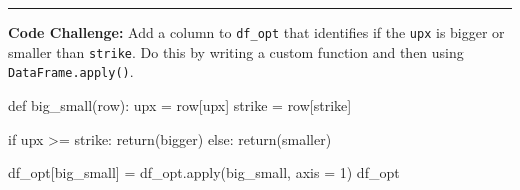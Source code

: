 \documentclass[
  letterpaper,
  DIV=11,
  numbers=noendperiod]{scrreprt}
\newenvironment{Shaded}{\begin{snugshade}}{\end{snugshade}}
\newcommand{\BuiltInTok}[1]{\textcolor[rgb]{0.00,0.23,0.31}{#1}}
\newcommand{\ControlFlowTok}[1]{\textcolor[rgb]{0.00,0.23,0.31}{#1}}
\newcommand{\DecValTok}[1]{\textcolor[rgb]{0.68,0.00,0.00}{#1}}
\newcommand{\KeywordTok}[1]{\textcolor[rgb]{0.00,0.23,0.31}{#1}}
\newcommand{\NormalTok}[1]{\textcolor[rgb]{0.00,0.23,0.31}{#1}}
\newcommand{\OperatorTok}[1]{\textcolor[rgb]{0.37,0.37,0.37}{#1}}
\newcommand{\StringTok}[1]{\textcolor[rgb]{0.13,0.47,0.30}{#1}}
\begin{document}
\begin{center}\rule{0.5\linewidth}{0.5pt}\end{center}

\textbf{Code Challenge:} Add a column to \texttt{df\_opt} that
identifies if the \texttt{upx} is bigger or smaller than
\texttt{strike}. Do this by writing a custom function and then using
\texttt{DataFrame.apply()}.

\begin{Shaded}
\begin{Highlighting}[]
\KeywordTok{def}\NormalTok{ big\_small(row):}
\NormalTok{    upx }\OperatorTok{=}\NormalTok{ row[}\StringTok{\textquotesingle{}upx\textquotesingle{}}\NormalTok{]}
\NormalTok{    strike }\OperatorTok{=}\NormalTok{ row[}\StringTok{\textquotesingle{}strike\textquotesingle{}}\NormalTok{]}
    
    \ControlFlowTok{if}\NormalTok{ upx }\OperatorTok{\textgreater{}=}\NormalTok{ strike:}
        \ControlFlowTok{return}\NormalTok{(}\StringTok{\textquotesingle{}bigger\textquotesingle{}}\NormalTok{)}
    \ControlFlowTok{else}\NormalTok{:}
        \ControlFlowTok{return}\NormalTok{(}\StringTok{\textquotesingle{}smaller\textquotesingle{}}\NormalTok{)}
\end{Highlighting}
\end{Shaded}

\begin{Shaded}
\begin{Highlighting}[]
\NormalTok{df\_opt[}\StringTok{\textquotesingle{}big\_small\textquotesingle{}}\NormalTok{] }\OperatorTok{=}\NormalTok{ df\_opt.}\BuiltInTok{apply}\NormalTok{(big\_small, axis }\OperatorTok{=} \DecValTok{1}\NormalTok{)}
\NormalTok{df\_opt}
\end{Highlighting}
\end{Shaded}
\end{document}
